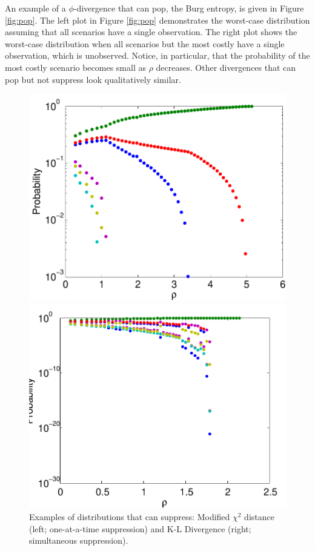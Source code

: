 \documentclass[ijoc,letterpaper]{informs3} %
\begin{document}
An example of a $\phi$-divergence that can pop, the Burg entropy, is given in Figure \ref{fig:pop}.
The left plot in Figure \ref{fig:pop} demonstrates the worst-case distribution assuming that all scenarios have a single observation.
The right plot shows the worst-case distribution when all scenarios but the most costly have a single observation, which is unobserved.
Notice, in particular, that the probability of the most costly scenario becomes small as $\rho$ decreases.
Other divergences that can pop but not suppress look qualitatively similar.

\begin{figure}
	\FIGURE
	{%
		\includegraphics*[width=.45\textwidth]{images/mchi2}%
		\includegraphics*[width=.45\textwidth]{images/kl}%
	}
	{
		Examples of distributions that can suppress: Modified $\chi^2$ distance (left; one-at-a-time suppression) and K-L Divergence (right; simultaneous suppression).
		\label{fig:suppress}
	}
	{}
\end{figure}
\end{document}
